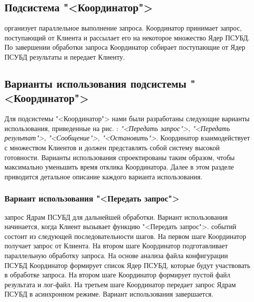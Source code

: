 \documentclass[11pt,oneside]{article}
\begin{document}
	\subsection{Подсистема "<Координатор">}\label{S_Coordinator}
	 организует параллельное выполнение запроса. Координатор принимает запрос, поступающий от Клиента и рассылает его на некоторое множество Ядер ПСУБД. По завершении обработки запроса Координатор собирает поступающие от Ядер ПСУБД результаты и передает Клиенту.
	\subsection{Варианты использования подсистемы "<Координатор">}\label{S_CoordinatorUseCases}
	
	
	Для подсистемы "<Координатор"> нами были разработаны следующие варианты использования, приведенные на рис. %
	: \textit{"<Передать запрос">}, \textit{"<Передать результат">}, \textit{"<Сообщение">}, \textit{"<Остановить">}. Координатор взаимодействует с множеством Клиентов и должен представлять собой систему высокой готовности. Варианты использования спроектированы таким образом, чтобы максимально уменьшить время отклика Координатора. Далее в этом разделе приводится детальное описание каждого варианта использования.
	
	\subsubsection{Вариант использования "<Передать запрос">}
	 запрос Ядрам ПСУБД для дальнейшей обработки. Вариант использования начинается, когда Клиент вызывает функцию "<Передать запрос">.
	 событий состоит из следующей последовательности шагов. На первом шаге Координатор получает запрос от Клиента. На втором шаге Координатор подготавливает параллельную обработку запроса. На основе анализа файла конфигурации ПСУБД Координатор формирует список Ядер ПСУБД, которые будут участвовать в обработке запроса. На втором шаге Координатор формирует пустой файл результата и лог-файл. На третьем шаге Координатор передает запрос Ядрам ПСУБД в асинхронном режиме. Вариант использования завершается.
	
\end{document}
